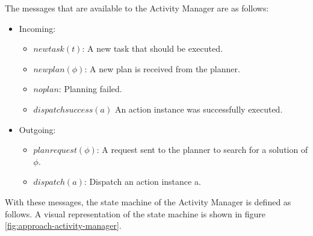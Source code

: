 The messages that are available to the Activity Manager are as follows:
\begin{itemize}
    \item Incoming:
    \begin{itemize}
        \item $newtask(t)$: A new task that should be executed. 
        \item $newplan(\phi)$: A new plan is received from the planner.
        \item $noplan$: Planning failed.
        \item $dispatchsuccess(a)$ An action instance was successfully executed.
    \end{itemize}
    \item Outgoing:
    \begin{itemize}
        \item $planrequest(\phi)$: A request sent to the planner to search for a solution of $\phi$.
        \item $dispatch(a)$: Dispatch an action instance a.
    \end{itemize}
\end{itemize}

With these messages, the state machine of the Activity Manager is defined as follows.
A visual representation of the state machine is shown in figure \ref{fig:approach-activity-manager}.

